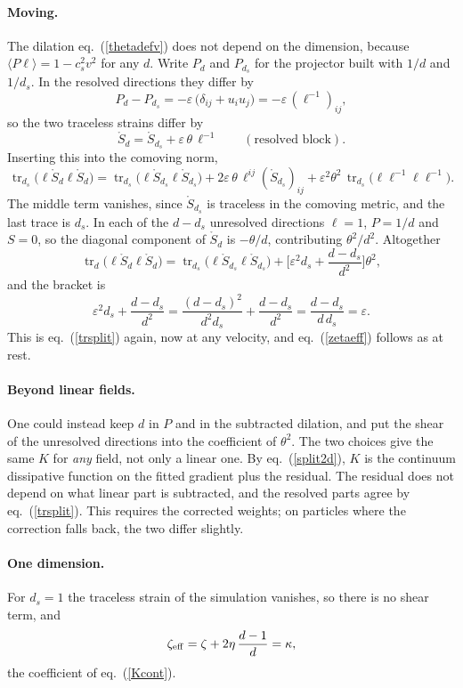 \documentclass[11pt,aps,preprint,nofootinbib,superscriptaddress,tightenlines]{revtex4-2}
\def\st{\begin{equation}}
\def\stp{\end{equation}}
\def\Eq#1{eq.~(\ref{#1})}
\providecommand{\tr}{\operatorname{tr}}
\newcommand{\avg}[1]{\langle #1\rangle}
\let\oldparagraph\paragraph
\renewcommand{\paragraph}{\par\bigskip\oldparagraph}
\begin{document}
\paragraph{Moving.}  The dilation \Eq{thetadefv} does not depend on the
dimension, because $\avg{P\ell}=1-c_s^2v^2$ for any $d$.  Write $P_d$ and
$P_{d_s}$ for the projector built with $1/d$ and $1/d_s$.  In the resolved
directions they differ by
\st
P_d-P_{d_s}=-\varepsilon\,\big(\delta_{ij}+u_iu_j\big)=-\varepsilon\,(\ell^{-1})_{ij},
\stp
so the two traceless strains differ by
\st
\mathring S_d=\mathring S_{d_s}+\varepsilon\,\theta\,\ell^{-1}
\qquad(\text{resolved block}).
\stp
Inserting this into the comoving norm,
\st
\tr_{d_s}\big(\ell\mathring S_d\ell\mathring S_d\big)
=\tr_{d_s}\big(\ell\mathring S_{d_s}\ell\mathring S_{d_s}\big)
+2\varepsilon\,\theta\,\ell^{ij}(\mathring S_{d_s})_{ij}
+\varepsilon^2\theta^2\,\tr_{d_s}\big(\ell\ell^{-1}\ell\ell^{-1}\big).
\stp
The middle term vanishes, since $\mathring S_{d_s}$ is traceless in the
comoving metric, and the last trace is $d_s$.  In each of the $d-d_s$
unresolved directions $\ell=1$, $P=1/d$ and $S=0$, so the diagonal component of
$\mathring S_d$ is $-\theta/d$, contributing $\theta^2/d^2$.  Altogether
\st
\tr_d\big(\ell\mathring S_d\ell\mathring S_d\big)
=\tr_{d_s}\big(\ell\mathring S_{d_s}\ell\mathring S_{d_s}\big)
+\Big[\varepsilon^2d_s+\frac{d-d_s}{d^2}\Big]\theta^2 ,
\stp
and the bracket is
\st
\varepsilon^2d_s+\frac{d-d_s}{d^2}
=\frac{(d-d_s)^2}{d^2d_s}+\frac{d-d_s}{d^2}
=\frac{d-d_s}{d\,d_s}=\varepsilon .
\stp
This is \Eq{trsplit} again, now at any velocity, and \Eq{zetaeff} follows as at
rest.

\paragraph{Beyond linear fields.}  One could instead keep $d$ in $P$ and in the
subtracted dilation, and put the shear of the unresolved directions into the
coefficient of $\theta^2$.  The two choices give the same $K$ for \emph{any}
field, not only a linear one.  By \Eq{split2d}, $K$ is the continuum
dissipative function on the fitted gradient plus the residual.  The residual
does not depend on what linear part is subtracted, and the resolved parts agree
by \Eq{trsplit}.  This requires the corrected weights; on particles where the
correction falls back, the two differ slightly.

\paragraph{One dimension.}  For $d_s=1$ the traceless strain of the simulation
vanishes, so there is no shear term, and
\st
\zeta_{\rm eff}=\zeta+2\eta\,\frac{d-1}{d}=\kappa ,
\stp
the coefficient of \Eq{Kcont}.
\end{document}

